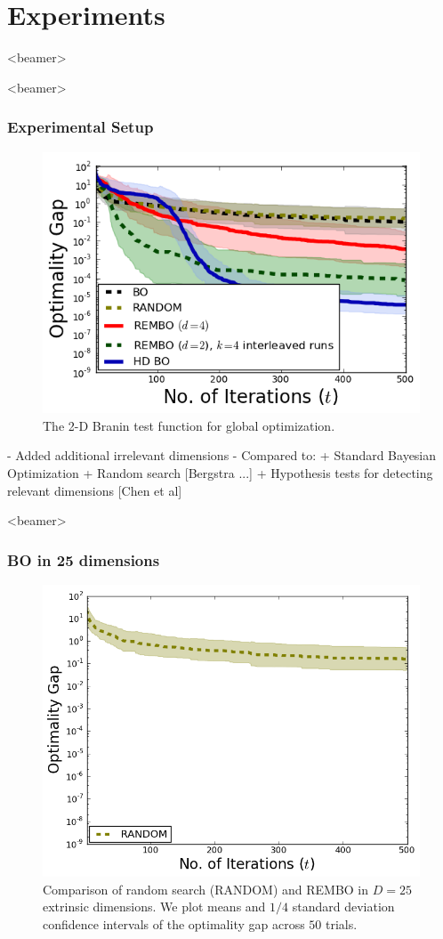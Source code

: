\documentclass[grey]{beamer}
\begin{document}
 \section{Experiments}
 \begin{frame}<beamer>
  \tableofcontents[currentsection]
 \end{frame}
 
 \begin{frame}<beamer>
  \frametitle{Experimental Setup}
  \begin{figure}
   \includegraphics[width=0.6\columnwidth]{../paper/figures/branin_dis_25.png}
   \caption{The 2-D Branin test function for global optimization.}
   \label{fig:standard}
  \end{figure}
  - Added additional irrelevant dimensions
  - Compared to:
    + Standard Bayesian Optimization
    + Random search [Bergstra ...]
    + Hypothesis tests for detecting relevant dimensions [Chen et al]
  \end{frame}

 
 \begin{frame}<beamer>
  \frametitle{BO in 25 dimensions}
  
  \begin{figure}
   \includegraphics[width=0.6\columnwidth]{./figs/branin_dis1.png}
    \caption{Comparison of random search (RANDOM) and REMBO
     in $D=25$ extrinsic dimensions. 
     We plot means and $1/4$ standard deviation confidence intervals of the optimality gap across $50$ trials.}
   \label{fig:standard}
  \end{figure}
 \end{frame}
 
\end{document}
